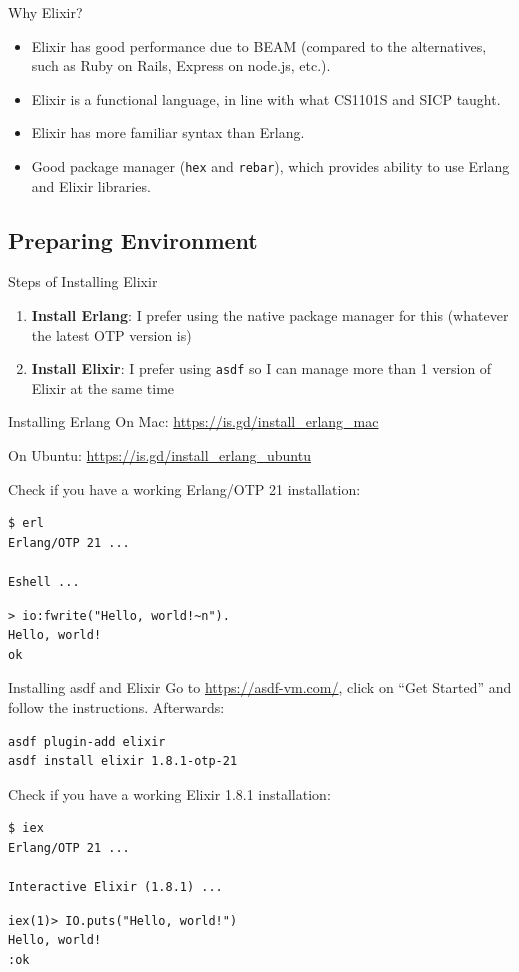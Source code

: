 \documentclass[12pt]{beamer}
\begin{document}
\begin{frame}{Why Elixir?}
  \begin{itemize}
    \item Elixir has good performance due to BEAM (compared to the alternatives, such as Ruby on Rails, Express on node.js, etc.).
    \item Elixir is a functional language, in line with what CS1101S and SICP taught.
    \item Elixir has more familiar syntax than Erlang.
    \item Good package manager (\texttt{hex} and \texttt{rebar}), which provides ability to use Erlang and Elixir libraries.
  \end{itemize}
\end{frame}

\subsection{Preparing Environment}
\begin{frame}{Steps of Installing Elixir}
  \begin{enumerate}
    \item \textbf{Install Erlang}: I prefer using the native package manager for this (whatever the latest OTP version is)
    \item \textbf{Install Elixir}: I prefer using \texttt{asdf} so I can manage more than 1 version of Elixir at the same time
  \end{enumerate}
\end{frame}

\begin{frame}[fragile]{Installing Erlang}
  On Mac: \url{https://is.gd/install_erlang_mac}

  On Ubuntu: \url{https://is.gd/install_erlang_ubuntu}

  Check if you have a working Erlang/OTP 21 installation:
  \begin{verbatim}
$ erl
Erlang/OTP 21 ...

Eshell ...
  \end{verbatim}
  \begin{verbatim}
> io:fwrite("Hello, world!~n").
Hello, world!
ok
  \end{verbatim}
\end{frame}

\begin{frame}[fragile]{Installing asdf and Elixir}
  Go to \url{https://asdf-vm.com/}, click on ``Get Started'' and follow the instructions. Afterwards:
  \begin{verbatim}
asdf plugin-add elixir
asdf install elixir 1.8.1-otp-21
  \end{verbatim}

  Check if you have a working Elixir 1.8.1 installation:
  \begin{verbatim}
$ iex
Erlang/OTP 21 ...

Interactive Elixir (1.8.1) ...
  \end{verbatim}
  \begin{verbatim}
iex(1)> IO.puts("Hello, world!")
Hello, world!
:ok
  \end{verbatim}
\end{frame}
\end{document}
